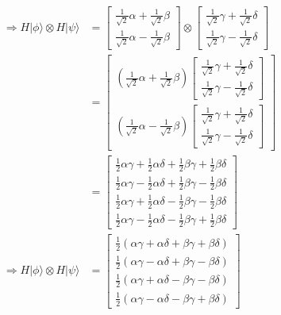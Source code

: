 \documentclass{article}
\begin{document}
\begin{equation}
\begin{split}
        \Longrightarrow H|\phi\rangle \otimes H|\psi\rangle & = \begin{bmatrix}
            \frac{1}{\sqrt{2}}\alpha + \frac{1}{\sqrt{2}}\beta \\
            \frac{1}{\sqrt{2}}\alpha - \frac{1}{\sqrt{2}}\beta
        \end{bmatrix} \otimes \begin{bmatrix}
            \frac{1}{\sqrt{2}}\gamma + \frac{1}{\sqrt{2}}\delta \\
            \frac{1}{\sqrt{2}}\gamma - \frac{1}{\sqrt{2}}\delta
        \end{bmatrix} \\
        & = \begin{bmatrix}
            (\frac{1}{\sqrt{2}}\alpha + \frac{1}{\sqrt{2}}\beta)\begin{bmatrix}
                \frac{1}{\sqrt{2}}\gamma + \frac{1}{\sqrt{2}}\delta \\
                \frac{1}{\sqrt{2}}\gamma - \frac{1}{\sqrt{2}}\delta                    
            \end{bmatrix} \\
            (\frac{1}{\sqrt{2}}\alpha - \frac{1}{\sqrt{2}}\beta)\begin{bmatrix}
                \frac{1}{\sqrt{2}}\gamma + \frac{1}{\sqrt{2}}\delta \\
                \frac{1}{\sqrt{2}}\gamma - \frac{1}{\sqrt{2}}\delta    
            \end{bmatrix}
        \end{bmatrix} \\
        & = \begin{bmatrix}
            \frac{1}{2}\alpha\gamma + \frac{1}{2}\alpha\delta + \frac{1}{2}\beta\gamma + \frac{1}{2}\beta\delta \\
            \frac{1}{2}\alpha\gamma - \frac{1}{2}\alpha\delta + \frac{1}{2}\beta\gamma - \frac{1}{2}\beta\delta \\
            \frac{1}{2}\alpha\gamma + \frac{1}{2}\alpha\delta - \frac{1}{2}\beta\gamma - \frac{1}{2}\beta\delta \\
            \frac{1}{2}\alpha\gamma - \frac{1}{2}\alpha\delta - \frac{1}{2}\beta\gamma + \frac{1}{2}\beta\delta
        \end{bmatrix} \\
        \Longrightarrow H|\phi\rangle \otimes H|\psi\rangle & = \begin{bmatrix}
            \frac{1}{2}(\alpha\gamma + \alpha\delta + \beta\gamma + \beta\delta) \\
            \frac{1}{2}(\alpha\gamma - \alpha\delta + \beta\gamma - \beta\delta) \\
            \frac{1}{2}(\alpha\gamma + \alpha\delta - \beta\gamma - \beta\delta) \\
            \frac{1}{2}(\alpha\gamma - \alpha\delta - \beta\gamma + \beta\delta)
        \end{bmatrix} \\
    \end{split}
\end{equation}
\end{document}

